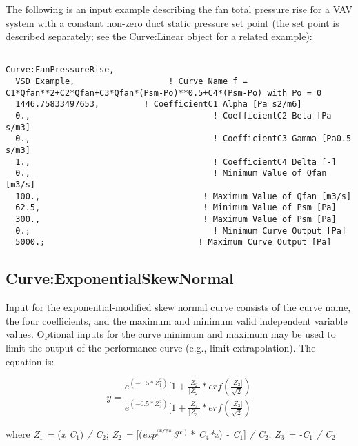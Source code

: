 The following is an input example describing the fan total pressure rise for a VAV system with a constant non-zero duct static pressure set point (the set point is described separately; see the Curve:Linear object for a related example):

\begin{lstlisting}

Curve:FanPressureRise,
  VSD Example,                   ! Curve Name f = C1*Qfan**2+C2*Qfan+C3*Qfan*(Psm-Po)**0.5+C4*(Psm-Po) with Po = 0
  1446.75833497653,         ! CoefficientC1 Alpha [Pa s2/m6]
  0.,                                     ! CoefficientC2 Beta [Pa s/m3]
  0.,                                     ! CoefficientC3 Gamma [Pa0.5 s/m3]
  1.,                                     ! CoefficientC4 Delta [-]
  0.,                                     ! Minimum Value of Qfan [m3/s]
  100.,                                 ! Maximum Value of Qfan [m3/s]
  62.5,                                 ! Minimum Value of Psm [Pa]
  300.,                                 ! Maximum Value of Psm [Pa]
  0.;                                     ! Minimum Curve Output [Pa]
  5000.;                               ! Maximum Curve Output [Pa]
\end{lstlisting}

\subsection{Curve:ExponentialSkewNormal}\label{curveexponentialskewnormal}

Input for the exponential-modified skew normal curve consists of the curve name, the four coefficients, and the maximum and minimum valid independent variable values. Optional inputs for the curve minimum and maximum may be used to limit the output of the performance curve (e.g., limit extrapolation). The equation is:

\begin{equation}
y = \frac{{{e^{( - 0.5*Z_1^2)}}[1 + \frac{{{Z_2}}}{{\left| {{Z_2}} \right|}}*erf\left( {\frac{{\left| {{Z_2}} \right|}}{{\sqrt 2 }}} \right)}}{{{e^{( - 0.5*Z_3^2)}}[1 + \frac{{{Z_3}}}{{\left| {{Z_3}} \right|}}*erf\left( {\frac{{\left| {{Z_3}} \right|}}{{\sqrt 2 }}} \right)}}
\end{equation}

where \emph{Z\(_{1}\) =} (\emph{x C\(_{1}\)}) \emph{/ C\(_{2}\)}; \emph{Z\(_{2}\) =} {[}(\emph{exp}\(^{(*C*}\)\emph{3\(^{\*x}\)}\(^{)}\) * \emph{C\(_{4}\)*x}) \emph{- C\(_{1}\)}{]} \emph{/ C\(_{2}\)}; \emph{Z\(_{3}\) = -C\(_{1}\) / C\(_{2}\)}

